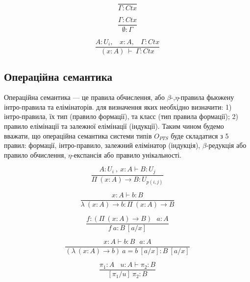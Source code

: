\begin{equation}
\tag{Ctx-formation}
\dfrac
{}
{\Gamma : Ctx}
\end{equation}

\begin{equation}
\tag{Ctx-intro$_1$}
\dfrac
{\Gamma : Ctx}
{\emptyset : \Gamma}
\end{equation}

\begin{equation}
\tag{Ctx-intro$_2$}
\dfrac
{A : U_i,\ \ \ \ x : A,\ \ \ \ \Gamma : Ctx}
{(x : A)\ \vdash\ \Gamma : Ctx}
\end{equation}

\newpage
\subsection{Операційна семантика}

Операційна семантика --- це правила обчислення,
або $\beta$-,$\eta$-правила фьюжену інтро-правила та елімінаторів.
для визначення яких необхідно визначити:
1) інтро-правила, їх тип (правило формації), та класс (тип правила формації);
2) правило елімінації та залежної елімінації (індукції).
Таким чином будемо вважати, що операційна семантика системи типів $O_{PTS}$
буде складатися з 5 правил: формації, інтро-правило,
залежний елімінатор (індукція), $\beta$-редукція або правило обчислення,
$\eta$-експансія або правило унікальності.

\begin{equation}
\tag{$\Pi$-formation}
\dfrac
{A:U_i\ ,\ x:A \vdash B : U_j}
{\Pi\ (x:A) \rightarrow B : U_{p(i,j)}}
\end{equation}

\begin{equation}
\tag{$\lambda$-intro}
\dfrac
{x:A \vdash b : B}
{\lambda\ (x:A) \rightarrow b : \Pi\ (x: A) \rightarrow B }
\end{equation}

\begin{equation}
\tag{$App$-elimination}
\dfrac
{f: (\Pi\ (x:A) \rightarrow B)\ \ \ a: A}
{f\ a : B\ [a/x]}
\end{equation}

\begin{equation}
\tag{$\beta$-computation}
\dfrac
{x:A \vdash b: B\ \ \ a:A}
{(\lambda\ (x:A) \rightarrow b)\ a = b\ [a/x] : B\ [a/x]}
\end{equation}

\begin{equation}
\tag{subst}
\dfrac
{\pi_1 : A\ \ \ \ u:A \vdash \pi_2 : B}
{[\pi_1/u]\ \pi_2 : B}
\end{equation}

